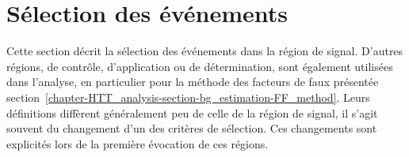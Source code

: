 \section{Sélection des événements}\label{chapter-HTT_analysis-section-selection}
Cette section décrit la sélection des événements dans la région de signal.
D'autres régions, de contrôle, d'application ou de détermination, sont également utilisées dans l'analyse, en particulier pour la méthode des facteurs de faux présentée section~\ref{chapter-HTT_analysis-section-bg_estimation-FF_method}.
Leurs définitions diffèrent généralement peu de celle de la région de signal, il s'agit souvent du changement d'un des critères de sélection.
Ces changements sont explicités lors de la première évocation de ces régions.

%

